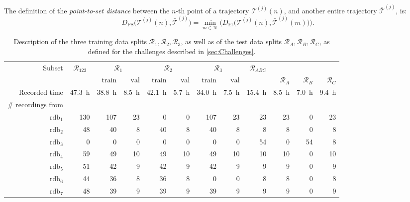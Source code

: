 \documentclass[a4paper, 10pt, conference]{ieeeconf}      %
\begin{document}
The definition of the \textit{point-to-set distance} between the \mbox{$n$-th} point of a trajectory $\mathcal T^{(j)}(n)$, and another entire trajectory $\bar{\mathcal T}^{(j)}$, is:
\begin{equation}
D_{\mathrm{PS}}\Big(\mathcal T^{(j)}(n), \bar{\mathcal T}^{(j)}\Big) = \min_{m \in \mathcal N} \bigg(D_{\mathrm{Et}}\Big(\mathcal T^{(j)}(n),\bar{\mathcal T}^{(j)}(m)\Big)\bigg).
\end{equation}
\begin{table}[!ht]
  \caption{Description of the three training data splits $\mathcal R_1, \mathcal R_2, \mathcal R_3$, as well as of the test data splits $\mathcal R_A, \mathcal R_B, \mathcal R_C$, as defined for the challenges described in \autoref{sec:Challenges}.} \label{tab:datasetSplits}
  \begin{center}
  \begin{tabular}{r||r||r|r||r|r||r|r||r||r||r||r}
    Subset & \multicolumn{1}{c||}{$\mathcal R_{123}$} & \multicolumn{2}{c||}{$\mathcal R_1$} & \multicolumn{2}{c||}{$\mathcal R_2$} & \multicolumn{2}{c||}{$\mathcal R_3$} & $\mathcal R_{ABC}$ & \multicolumn{3}{c}{}  \\
& & $\text{train}$ & $\text{val}$ & $\text{train}$ & $\text{val}$ & $\text{train}$ & $\text{val}$ & & $\mathcal R_A$ & $\mathcal R_B$ & $\mathcal R_C$ \\
\hline
\hline
Recorded time & \SI{47,3}{\hour} & \SI{38,8}{\hour} & \SI{8,5}{\hour} & \SI{42,1}{\hour} & \SI{5,7}{\hour} & \SI{34,0}{\hour} & \SI{7,5}{\hour} & \SI{15,4}{\hour} & \SI{8,5}{\hour} & \SI{7,0}{\hour} & \SI{9,4}{\hour} \\
\hline
\hline
\# recordings from & & & & & & & & & & \\
$\text{rdb}_1$ & 130 & 107 & 23 & 0 & 0 & 107 & 23 &  23 & 23 & 0 & 23 \\
$\text{rdb}_2$ & 48 & 40 & 8 & 40 &  8 & 40 & 8 & 8 & 8 & 0 & 8 \\
$\text{rdb}_3$ & 0 & 0 & 0 & 0 & 0 & 0 & 0 & 54 & 0 & 54 & 8 \\
$\text{rdb}_4$ & 59 & 49 & 10 & 49 & 10 & 49 & 10 & 10 & 10 & 0 & 10 \\
$\text{rdb}_5$ & 51 & 42 & 9 & 42 & 9 & 42 & 9 & 9 & 9 & 0 & 9 \\
$\text{rdb}_6$ & 44 & 36 & 8 & 36 & 8 & 0 & 0 & 8 & 8 & 0 & 8 \\
$\text{rdb}_7$ & 48 & 39 & 9 & 39 & 9 & 39 & 9 & 9 & 9 & 0 & 9  \\
\end{tabular}

  \end{center}
\end{table}
\vspace*{-0.5cm}
\end{document}
